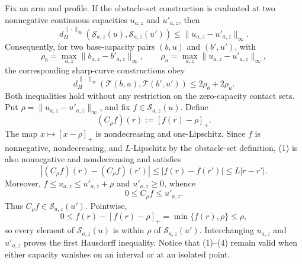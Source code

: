 Fix an arm and profile.  If the obstacle-set construction is evaluated at two nonnegative continuous capacities \(u_{a,z}\) and \(u'_{a,z}\), then
\[
d_H^{\|\cdot\|_\infty}\!\left(\mathcal S_{a,z}(u),\mathcal S_{a,z}(u')\right)
\leq \|u_{a,z}-u'_{a,z}\|_\infty.
\]
Consequently, for two base-capacity pairs \((b,u)\) and \((b',u')\), with
\[
\rho_b=\max_{a,z}\|b_{a,z}-b'_{a,z}\|_\infty,
\qquad
\rho_u=\max_{a,z}\|u_{a,z}-u'_{a,z}\|_\infty,
\]
the corresponding sharp-curve constructions obey
\[
d_H^{\|\cdot\|_\infty}\!\left(\mathcal T(b,u),\mathcal T(b',u')\right)
\leq 2\rho_b+2\rho_u.
\]
Both inequalities hold without any restriction on the zero-capacity contact sets.
Put \(\rho=\|u_{a,z}-u'_{a,z}\|_\infty\), and fix \(f\in\mathcal S_{a,z}(u)\).  Define
\[
(C_\rho f)(r):=[f(r)-\rho]_+.
\tag{1}
\]
The map \(x\mapsto[x-\rho]_+\) is nondecreasing and one-Lipschitz.  Since \(f\) is nonnegative, nondecreasing, and \(L\)-Lipschitz by the obstacle-set definition, (1) is also nonnegative and nondecreasing and satisfies
\[
|(C_\rho f)(r)-(C_\rho f)(r')|
\leq |f(r)-f(r')|
\leq L|r-r'|.
\tag{2}
\]
Moreover, \(f\leq u_{a,z}\leq u'_{a,z}+\rho\) and \(u'_{a,z}\geq0\), whence
\[
0\leq C_\rho f\leq u'_{a,z}.
\tag{3}
\]
Thus \(C_\rho f\in\mathcal S_{a,z}(u')\).  Pointwise,
\[
0\leq f(r)-[f(r)-\rho]_+=\min\{f(r),\rho\}\leq\rho,
\tag{4}
\]
so every element of \(\mathcal S_{a,z}(u)\) is within \(\rho\) of \(\mathcal S_{a,z}(u')\).  Interchanging \(u_{a,z}\) and \(u'_{a,z}\) proves the first Hausdorff inequality.  Notice that (1)--(4) remain valid when either capacity vanishes on an interval or at an isolated point.

